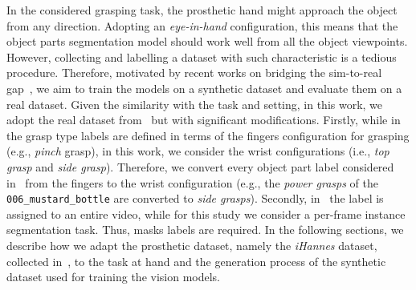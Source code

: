 




In the considered grasping task, the prosthetic hand might approach the object from any direction. Adopting an \textit{eye-in-hand} configuration, this means that the object parts segmentation model should work well from all the object viewpoints. 
However, collecting and labelling a dataset with such characteristic is a tedious procedure. Therefore, motivated by recent works on bridging the sim-to-real gap~\cite{vasile2022}, we aim to train the models on a synthetic dataset and evaluate them on a real dataset. 
Given the similarity with the task and setting, in this work, we adopt the real dataset from~\cite{vasile2022} but with significant modifications. Firstly, while in~\cite{vasile2022} the grasp type labels are defined in terms of the fingers configuration for grasping (e.g., \textit{pinch} grasp), in this work, we consider the wrist configurations (i.e., \textit{top grasp} and \textit{side grasp}). Therefore, we convert every object part label considered in~\cite{vasile2022} from the fingers to the wrist configuration (e.g., the \textit{power grasps} of the \texttt{006\_mustard\_bottle} are converted to \textit{side grasps}). Secondly, in~\cite{vasile2022} the label is assigned to an entire video, while for this study we consider a per-frame instance segmentation task. Thus, masks labels are required. In the following sections, we describe how we adapt the prosthetic dataset, namely the \textit{iHannes} dataset, collected in~\cite{vasile2022}, to the task at hand and the generation process of the synthetic dataset used for training the vision models.


